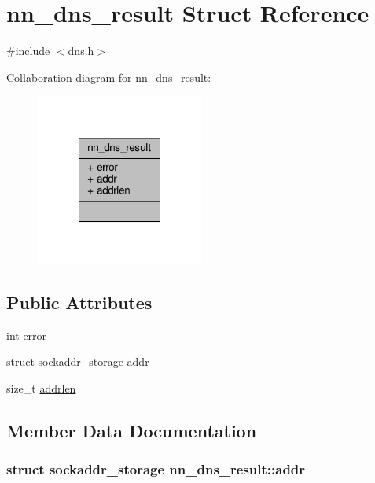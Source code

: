 \hypertarget{structnn__dns__result}{}\section{nn\+\_\+dns\+\_\+result Struct Reference}
\label{structnn__dns__result}


{\ttfamily \#include $<$dns.\+h$>$}



Collaboration diagram for nn\+\_\+dns\+\_\+result\+:\nopagebreak
\begin{figure}[H]
\begin{center}
\leavevmode
\includegraphics[width=156pt]{structnn__dns__result__coll__graph}
\end{center}
\end{figure}
\subsection*{Public Attributes}
\begin{DoxyCompactItemize}
\item 
int \hyperlink{structnn__dns__result_ad567eeaddc0e791da283e28911a1fe63}{error}
\item 
struct sockaddr\+\_\+storage \hyperlink{structnn__dns__result_ae9d56c807d97208851456a66d41255bd}{addr}
\item 
size\+\_\+t \hyperlink{structnn__dns__result_ab1533870912af14f5143555a83d6b36e}{addrlen}
\end{DoxyCompactItemize}


\subsection{Member Data Documentation}
\subsubsection[{addr}]{\setlength{\rightskip}{0pt plus 5cm}struct sockaddr\+\_\+storage nn\+\_\+dns\+\_\+result\+::addr}\hypertarget{structnn__dns__result_ae9d56c807d97208851456a66d41255bd}{}\label{structnn__dns__result_ae9d56c807d97208851456a66d41255bd}
